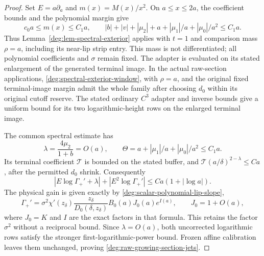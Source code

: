 \begin{proof}
Set \(E=a\partial_a\) and \(m(x)=M(x)/x^2\). On \(a\le x\le2a\),
the coefficient bounds and the polynomial margin give
\[
 c_0a\le m(x)\le C_1a,\qquad
 |b|+|v|+|\mu_2|+a+|\mu_1|/a+|\mu_0|/a^2\le C_1a.
\]
Thus Lemma~\ref{deg:lem-spectral-exterior} applies with \(t=1\)
and comparison mass \(\rho=a\), including its near-lip strip entry.
This mass is not differentiated;
all polynomial coefficients and \(\sigma\) remain fixed. The adapter
is evaluated on its stated enlargement of the generated terminal image.
In the actual raw-section applications,
\eqref{deg:spectral-exterior-window}, with \(\rho=a\), and the
original fixed terminal-image margin admit the whole family after
choosing \(d_0\) within its original cutoff reserve. The stated
ordinary \(C^3\) adapter and inverse bounds give a uniform bound for
its two logarithmic-height rows on the enlarged terminal image.

The common spectral estimate has
\[
 \lambda=\frac{4\mu_2}{1+b}=O(a),\qquad
 \Theta=a+|\mu_1|/a+|\mu_0|/a^2\le C_1a.
\]
Its terminal coefficient \(\mathcal T\) is bounded on the stated
buffer, and \(\mathcal T(a/\delta)^{2-\lambda}\le Ca\), after
the permitted \(d_0\) shrink. Consequently
\[
 |E\log\Gamma_+'+\lambda|+|E^2\log\Gamma_+'|
 \le Ca(1+|\log a|).
\]
The physical gain is given exactly by
\eqref{deg:scalar-polynomial-lip-slope},
\begin{equation}\label{deg:weighted-complete-positive-derivative}
 \Gamma_+'=\sigma^2\chi'(z_\delta)\frac{z_\delta}{D_0(\delta,z_\delta)}
                 B_0(a)J_0(a)e^{I(a)},\qquad J_0=1+O(a),
\end{equation}
where \(J_0=K\) and \(I\) are the exact factors in that formula.
This retains the factor \(\sigma^2\) without a reciprocal bound.
Since \(\lambda=O(a)\), both uncorrected logarithmic rows satisfy
the stronger first-logarithmic-power bound. Frozen affine calibration
leaves them unchanged, proving \eqref{deg:raw-growing-section-jets}.
\end{proof}

